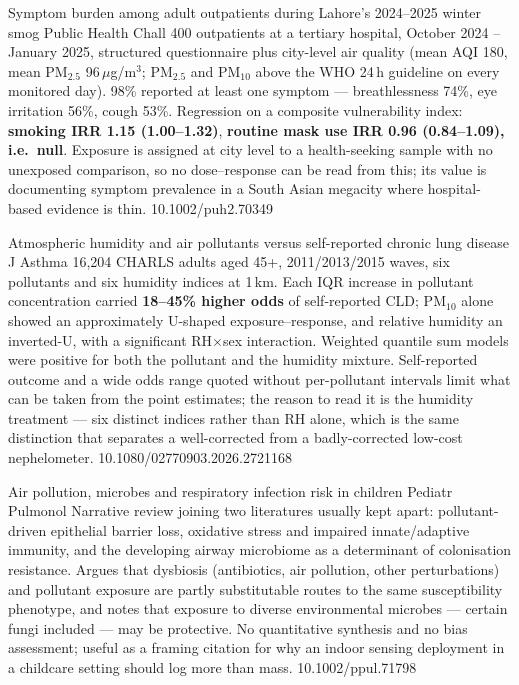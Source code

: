 \documentclass[10pt]{article}
\begin{document}

{Symptom burden among adult outpatients during Lahore's 2024--2025 winter smog}
{Public Health Chall}
{400 outpatients at a tertiary hospital, October 2024 -- January 2025, structured
questionnaire plus city-level air quality (mean AQI 180, mean PM$_{2.5}$ 96\,$\mu$g/m$^3$;
PM$_{2.5}$ and PM$_{10}$ above the WHO 24\,h guideline on every monitored day). 98\% reported
at least one symptom --- breathlessness 74\%, eye irritation 56\%, cough 53\%. Regression on a
composite vulnerability index: \textbf{smoking IRR 1.15 (1.00--1.32)}, \textbf{routine mask
use IRR 0.96 (0.84--1.09), i.e.\ null}. Exposure is assigned at city level to a
health-seeking sample with no unexposed comparison, so no dose--response can be read from
this; its value is documenting symptom prevalence in a South Asian megacity where
hospital-based evidence is thin.}
{10.1002/puh2.70349}

{Atmospheric humidity and air pollutants versus self-reported chronic lung disease}
{J Asthma}
{16{,}204 CHARLS adults aged 45+, 2011/2013/2015 waves, six pollutants and six humidity
indices at 1\,km. Each IQR increase in pollutant concentration carried
\textbf{18--45\% higher odds} of self-reported CLD; PM$_{10}$ alone showed an approximately
U-shaped exposure--response, and relative humidity an inverted-U, with a significant
RH$\times$sex interaction. Weighted quantile sum models were positive for both the pollutant
and the humidity mixture. Self-reported outcome and a wide odds range quoted without
per-pollutant intervals limit what can be taken from the point estimates; the reason to read
it is the humidity treatment --- six distinct indices rather than RH alone, which is the same
distinction that separates a well-corrected from a badly-corrected low-cost nephelometer.}
{10.1080/02770903.2026.2721168}

{Air pollution, microbes and respiratory infection risk in children}
{Pediatr Pulmonol}
{Narrative review joining two literatures usually kept apart: pollutant-driven epithelial
barrier loss, oxidative stress and impaired innate/adaptive immunity, and the developing
airway microbiome as a determinant of colonisation resistance. Argues that dysbiosis
(antibiotics, air pollution, other perturbations) and pollutant exposure are partly
substitutable routes to the same susceptibility phenotype, and notes that exposure to
diverse environmental microbes --- certain fungi included --- may be protective. No
quantitative synthesis and no bias assessment; useful as a framing citation for why an
indoor sensing deployment in a childcare setting should log more than mass.}
{10.1002/ppul.71798}
\end{document}
